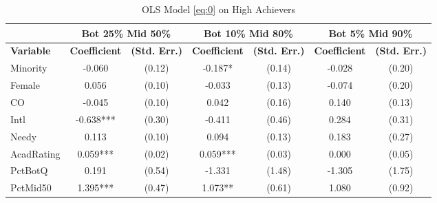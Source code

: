 \clearpage{}


\newpage{}

\begin{sidewaystable}[htb]\centering
  \begin{threeparttable}
    \caption{OLS Model \eqref{eq:0} on High Achievers}\label{table:c3}
    \begin{tabular}{l|c|c|c|c|c|c}
      \hline\hline 
                        & \multicolumn{2}{|c|}{Bot 25\% Mid 50\%} & \multicolumn{2}{|c|}{Bot 10\% Mid 80\%} & \multicolumn{2}{|c}{Bot 5\% Mid 90\%} \\
      \hline
      \textbf{Variable} & \textbf{Coefficient}         & \textbf{(Std. Err.)}         & \textbf{Coefficient} & \textbf{(Std. Err.)} & \textbf{Coefficient} & \textbf{(Std. Err.)} \\ 
      \hline
      \hline 
      Minority            &      -0.060                       &      (0.12)   &      -0.187*                      &      (0.14)   &      -0.028                       &      (0.20)   \\
      Female              &       0.056                       &      (0.10)   &      -0.033                       &      (0.13)   &      -0.074                       &      (0.20)   \\
      CO                  &      -0.045                       &      (0.10)   &       0.042                       &      (0.16)   &       0.140                       &      (0.13)   \\
      Intl                &      -0.638***                    &      (0.30)   &      -0.411                       &      (0.46)   &       0.284                       &      (0.31)   \\
      Needy               &       0.113                       &      (0.10)   &       0.094                       &      (0.13)   &       0.183                       &      (0.27)   \\
      AcadRating          &       0.059***                    &      (0.02)   &       0.059***                    &      (0.03)   &       0.000                       &      (0.05)   \\
      PctBotQ             &       0.191                       &      (0.54)   &      -1.331                       &      (1.48)   &      -1.305                       &      (1.75)   \\
      PctMid50            &       1.395***                    &      (0.47)   &       1.073**                     &      (0.61)   &       1.080                       &      (0.92)   \\

\end{tabular}
\end{threeparttable}
\end{sidewaystable}
